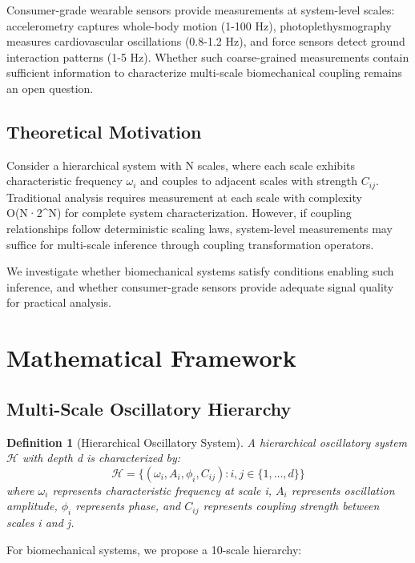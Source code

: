 \documentclass[12pt,twocolumn]{article}
\newtheorem{definition}{Definition}
\begin{document}
Consumer-grade wearable sensors provide measurements at system-level scales: accelerometry captures whole-body motion (1-100 Hz), photoplethysmography measures cardiovascular oscillations (0.8-1.2 Hz), and force sensors detect ground interaction patterns (1-5 Hz). Whether such coarse-grained measurements contain sufficient information to characterize multi-scale biomechanical coupling remains an open question.

\subsection{Theoretical Motivation}

Consider a hierarchical system with N scales, where each scale exhibits characteristic frequency $\omega_i$ and couples to adjacent scales with strength $C_{ij}$. Traditional analysis requires measurement at each scale with complexity O(N·2^N) for complete system characterization. However, if coupling relationships follow deterministic scaling laws, system-level measurements may suffice for multi-scale inference through coupling transformation operators.

We investigate whether biomechanical systems satisfy conditions enabling such inference, and whether consumer-grade sensors provide adequate signal quality for practical analysis.

\section{Mathematical Framework}

\subsection{Multi-Scale Oscillatory Hierarchy}

\begin{definition}[Hierarchical Oscillatory System]
A hierarchical oscillatory system $\mathcal{H}$ with depth d is characterized by:
\begin{equation}
\mathcal{H} = \{(\omega_i, A_i, \phi_i, C_{ij}) : i,j \in \{1,\ldots,d\}\}
\end{equation}
where $\omega_i$ represents characteristic frequency at scale i, $A_i$ represents oscillation amplitude, $\phi_i$ represents phase, and $C_{ij}$ represents coupling strength between scales i and j.
\end{definition}

For biomechanical systems, we propose a 10-scale hierarchy:
\end{document}
